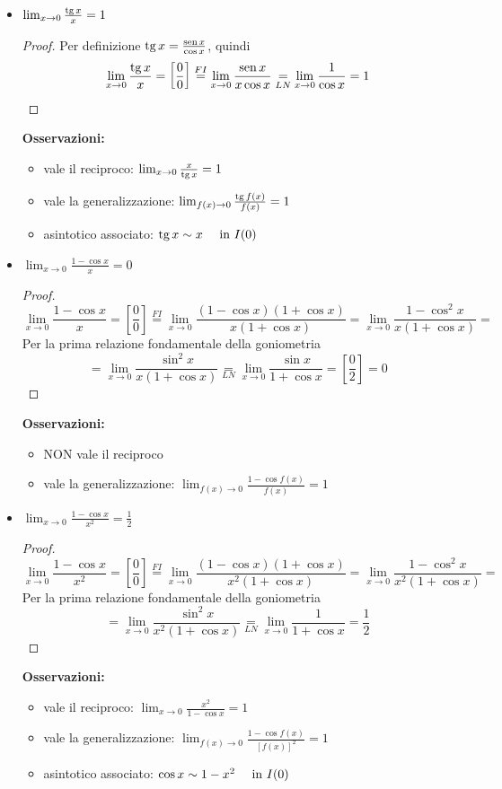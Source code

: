 \begin{itemize}
\begin{itemize}
\end{itemize}
\item {$\lim_{x\to 0}\frac{\operatorname{tg} x}{x}=1$}~
\\\begin{proof}
    Per definizione $\operatorname{tg} x=\frac{\operatorname{sen} x}{\cos x}$, quindi \[\lim_{x\to 0} \frac{\operatorname{tg} x}{x}=\left[\frac{0}{0}\right]\overset{FI}{=}\lim_{x\to 0} \frac{\operatorname{sen} x}{x \cos x}\underset{LN}{=}\lim_{x\to 0} \frac{1}{\cos x}=1\]
\end{proof}
\textbf{Osservazioni:}
\begin{itemize}
    \item vale il reciproco: $\lim_{x\to 0}\frac{x}{\operatorname{tg} x}=1$
    \item vale la generalizzazione: $\lim_{f(x)\to 0}\frac{\operatorname{tg} f(x)}{f(x)}=1$
    \item asintotico associato: $\operatorname{tg} x \sim x ~~~~\textnormal{in } I(0)$
\end{itemize}

\item {$\lim_{x\to 0}\frac{1-\cos x}{x}=0$}
\begin{proof}
\[\lim_{x\to 0} \frac{1-\cos x}{x}=\left[\frac{0}{0}\right]\overset{FI}{=}\lim_{x\to 0}\frac{(1-\cos x)(1+\cos x)}{x(1+\cos x)}=\lim_{x\to 0}\frac{1-\cos^2 x}{x(1+\cos x)}=\]Per la prima relazione fondamentale della goniometria\[=\lim_{x\to 0}\frac{\sin^2 x}{x(1+\cos x)}\underset{LN}{=}\lim_{x\to 0}\frac{\sin x}{1+\cos x}=\left[\frac{0}{2}\right]=0\]
\end{proof}
\textbf{Osservazioni:}
\begin{itemize}
    \item NON vale il reciproco
    \item vale la generalizzazione: $\lim_{f(x)\to 0}\frac{1-\cos f(x)}{f(x)}=1$
\end{itemize}

\item {$\lim_{x\to 0}\frac{1-\cos x}{x^2}=\frac{1}{2}$}
\begin{proof}
\[\lim_{x\to 0} \frac{1-\cos x}{x^2}=\left[\frac{0}{0}\right]\overset{FI}{=}\lim_{x\to 0}\frac{(1-\cos x)(1+\cos x)}{x^2(1+\cos x)}=\lim_{x\to 0}\frac{1-\cos^2 x}{x^2(1+\cos x)}=\]Per la prima relazione fondamentale della goniometria\[=\lim_{x\to 0}\frac{\sin^2 x}{x^2(1+\cos x)}\underset{LN}{=}\lim_{x\to 0}\frac{1}{1+\cos x}=\frac{1}{2}\]
\end{proof}
\textbf{Osservazioni:}
\begin{itemize}
    \item vale il reciproco: $\lim_{x\to 0}\frac{x^2}{1-\cos x}=1$
    \item vale la generalizzazione: $\lim_{f(x)\to 0}\frac{1- \cos f(x)}{[f(x)]^2}=1$
    \item asintotico associato: $\cos x \sim 1 - x^2 ~~~~\textnormal{in } I(0)$
\end{itemize}


\end{itemize}
